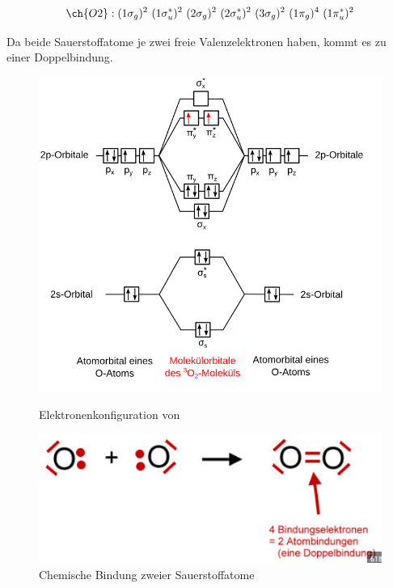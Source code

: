 \label{q:69}

\[\ch{O2} : (1\sigma_g)^2 ~ (1\sigma_u^*)^2 ~ (2\sigma_g)^2 ~ (2\sigma_u^*)^2 ~ (3\sigma_g)^2 ~ (1\pi_g)^4 ~ (1\pi_u^*)^2\]

Da beide Sauerstoffatome je zwei freie Valenzelektronen haben, kommt es zu einer Doppelbindung.

\setcapindent{0pt}
\begin{figure}[H]
   \centering
   \begin{minipage}[t]{0.475\linewidth}
      \centering
      \includegraphics[width=\linewidth]{resources/28-11-2018/O2.PNG}
      \caption{Elektronenkonfiguration von }
      \label{fig:Elektronenkonfiguration_O2}
   \end{minipage}%
   \hspace*{\fill}
   \begin{minipage}[t]{0.475\linewidth}
      \centering
      \includegraphics[width=\linewidth]{resources/28-11-2018/o2_bindung.PNG}
      \caption{Chemische Bindung zweier Sauerstoffatome}
      \label{fig:chemische_Bindung_O2}
   \end{minipage}
\end{figure}
\setcaphanging

\newpage